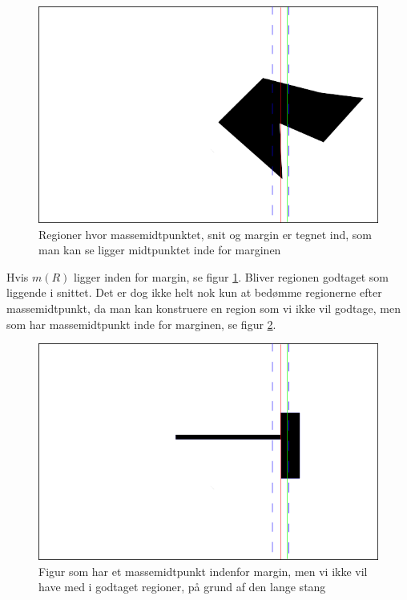 {\begin{figure}[h]
	\begin{center}
		\includegraphics[scale=0.5,angle=0]{afsnit/vores_implementation/billeder/udvidet_loesning/cOMCutMargin.png}
	\end{center}
	\caption[]{Regioner hvor massemidtpunktet, snit og margin er tegnet ind, som man kan se ligger midtpunktet inde for marginen}
	\label{cOMCutMargin}
\end{figure}

Hvis $m(R)$ ligger inden for margin, se figur \ref{cOMCutMargin}. Bliver
regionen godtaget som liggende i snittet. Det er dog ikke helt nok kun
at bedømme regionerne efter massemidtpunkt, da man kan konstruere en
region som vi ikke vil godtage, men som har massemidtpunkt inde for
marginen, se figur \ref{dontwork}. 

\begin{figure}[h]
	\begin{center}
		\includegraphics[scale=0.5,angle=0]{afsnit/vores_implementation/billeder/udvidet_loesning/dontWork.png}
	\end{center}
	\caption[]{Figur som har et massemidtpunkt indenfor margin, men vi ikke vil have med i godtaget regioner, på grund af den lange stang}
	\label{dontwork}
\end{figure}

}
